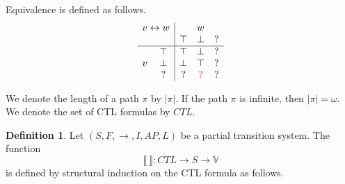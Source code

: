 \documentclass[12pt]{article}
\newcommand{\nxt}{\bigcirc}
\newcommand{\TRUE}{\mbox{\lstinline{true}}}
\newcommand{\FALSE}{\mbox{\lstinline{false}}}
\theoremstyle{definition}
\newtheorem{definition}{Definition}
\newcommand{\satisfaction}[1]{\llbracket #1 \rrbracket}
\newenvironment{franck}{\color{red}}{\color{black}}
\begin{document}
Equivalence is defined as follows.
\[
\begin{array}{cc|ccc}
\multicolumn{2}{c|}{v \leftrightarrow w} & & w &\\
&& \top & \perp & \mathord{?}\\\hline
& \top & \top & \perp & ?\\
v & \perp & \perp & \top & ?\\
& \mathord{?} & ? & \begin{franck}?\end{franck} & ?
\end{array}
\]

We denote the length of a path $\pi$ by $|\pi|$.  If the path $\pi$ is infinite, then $|\pi| = \omega$.  We denote the set of CTL formulas by $\mathit{CTL}$.

\begin{definition}
Let $(S, F, \rightarrow, I, \mathit{AP}, L)$ be a partial transition system.  The function 
\[
\satisfaction{\ } : \mathit{CTL} \to S \to \mathbb{V}
\] 
is defined by structural induction on the CTL formula as follows.
\end{definition}
\end{document}
